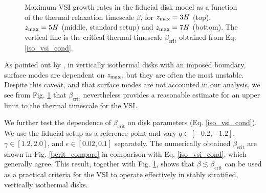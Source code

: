\begin{figure}
  \caption{Maximum VSI growth rates in the fiducial disk 
     model as a function of the thermal relaxation timescale
     $\beta$, for $z_\mathrm{max}=3H$ (top), $z_\mathrm{max}=5H$ (middle, standard
     setup) and $z_\mathrm{max}=7H$ (bottom). The vertical line is the
     critical thermal timescale $\beta_\mathrm{crit}$ obtained  
     from Eq. \ref{iso_vsi_cond}. 
     \label{bcrit_compare1}}   
 \end{figure} 

As pointed out by \cite{barker15}, in vertically isothermal disks with
an imposed boundary, surface modes are dependent on $z_\mathrm{max}$, but they
are often the most unstable. Despite this caveat, and that surface
modes are not accounted in our analysis, we see from
Fig. \ref{bcrit_compare1} that $\beta_\mathrm{crit}$ nevertheless
provides a reasonable estimate for an upper limit to the thermal
timescale for the VSI. 

We further  test the dependence of $\beta_\mathrm{crit}$ on disk parameters
(Eq. \ref{iso_vsi_cond}).  We use the fiducial setup as a  reference
point and vary $q\in[-0.2,-1.2]$,  $\gamma\in[1.2,2.0]$, and
$\epsilon\in[0.02,0.1]$ separately. The numerically obtained
$\beta_\mathrm{crit}$ are shown in Fig. \ref{bcrit_compare} in
comparison with Eq. \ref{iso_vsi_cond}, which generally agree. This
result, together with Fig. \ref{bcrit_compare1}, shows that  
$\beta \lesssim \beta_\mathrm{crit}$ can be used as a practical
criteria for the VSI to operate effectively in stably stratified,
vertically isothermal disks.   


